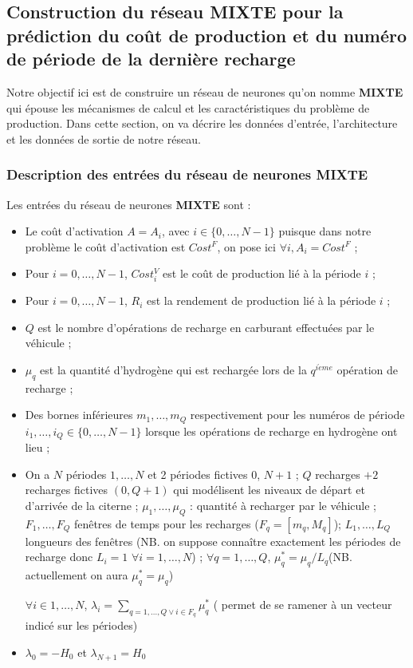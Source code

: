 \subsection{Construction du réseau \textbf{MIXTE} pour la prédiction du coût de production et du numéro de période de la dernière recharge}
 Notre objectif ici est de construire un réseau de neurones qu'on nomme \textbf{MIXTE} qui épouse les mécanismes de calcul et les caractéristiques du problème de production. Dans cette section, on va décrire les données d'entrée, l'architecture et les données de sortie de notre réseau.
\subsubsection{Description des entrées du réseau de neurones \textbf{MIXTE}}

Les entrées du réseau de neurones \textbf{MIXTE} sont :
\begin{itemize}[label=$\square$]
 \item Le coût d'activation $A=A_i$, avec $i \in \{0, \dots, N-1\}$ puisque dans notre problème le coût d'activation est $Cost^F$, on pose ici $\forall i, A_i=Cost^F$ ;
 \item Pour $i=0, \dots, N-1$, $Cost_i^V$ est le coût de production lié à la période $i$ ;
\item Pour $i=0, \dots, N-1$, $R_i$ est la rendement de production lié à la période $i$ ;
\item $Q$ est le nombre d'opérations de recharge en carburant effectuées par le véhicule ;
\item $\mu_q$ est la quantité d'hydrogène qui est rechargée lors de la $q^{i\grave eme}$ opération de recharge ;
\item Des bornes inférieures $m_1, \dots,m_Q$ respectivement pour les numéros de période $i_1, \dots, i_Q\in \{0, \dots, N-1\}$ lorsque les opérations de recharge en hydrogène ont lieu ; 
\item 
 On a $N$ périodes $1, \dots, N$ et 2 périodes fictives $0$, $N+1$ ; $Q$ recharges $+ 2$ recharges fictives $(0, Q+1)$ qui modélisent les niveaux de départ et d'arrivée de la citerne ; $\mu_1, \dots, \mu_Q$ : quantité à recharger par le véhicule ; $F_1, \dots, F_Q$  fenêtres de temps pour les recharges ($F_q=[m_q,M_q ]$); $L_1, \dots, L_Q$ longueurs des fenêtres (NB. on suppose connaître exactement les périodes de recharge donc $L_i=1$ $\forall i=1, \dots, N$) ; $\forall q=1, \dots, Q$, $\mu_q^*=\mu_q/L_q$(NB. actuellement on aura $\mu_q^*=\mu_q$)
 
$\forall i \in 1, \dots, N$, $\lambda_i=\sum_{q=1, \dots, Q \lor i\in F_q} \mu_q^*$  ( permet de se ramener à un vecteur indicé sur les périodes)
\item $\lambda_0=-H_0$ et $\lambda_{N+1}=H_0$

\end{itemize}


